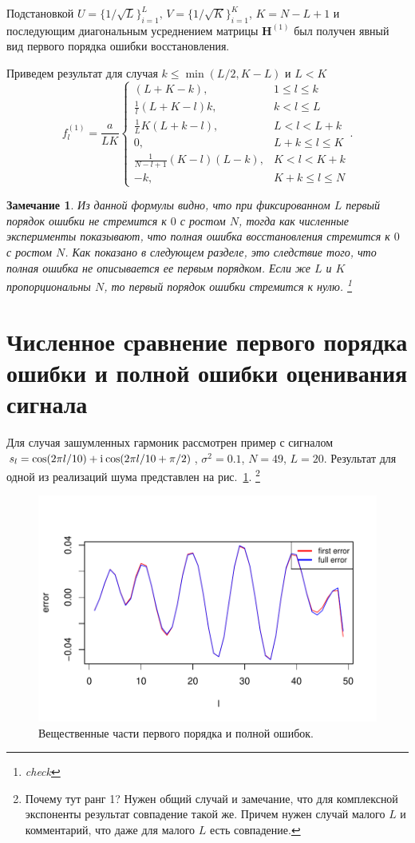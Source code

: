 \documentclass{spisok-article}
\newtheorem{remark}{Замечание}%
\begin{document}
Подстановкой $U = \{1/\sqrt{L}\}^{L}_{i = 1},\, V = \{1/\sqrt{K}\}^{K}_{i = 1}$, $K = N - L + 1$ и последующим диагональным усреднением матрицы $\mathbf{H}^{(1)}$ был получен явный вид первого порядка ошибки восстановления.

Приведем результат для случая $k \leq \min(L/2, K - L)$ и $L < K$
$$f^{(1)}_l = \frac{a}{{LK}}
\begin{cases}
	(L + K - k), & \text{$1 \leq l \leq k$}\\
	\frac{1}{l}(L + K - l)k, & \text{$k < l \leq L$}\\
	\frac{1}{L}K(L + k - l), &\text{$L < l < L + k$}\\
	0, &\text{$L + k \leq l \leq K$}\\
	\frac{1}{N - l + 1}(K - l)(L - k), &\text{$K < l < K + k$}\\
	-k, &\text{$K + k \leq l \leq N $}
\end{cases}.$$

\begin{remark}
Из данной формулы видно, что при фиксированном $L$ первый порядок ошибки не стремится к $0$ с ростом $N$, тогда как численные эксперименты показывают, что полная ошибка восстановления стремится к $0$ с ростом $N$. Как показано в следующем разделе, это следствие того, что полная ошибка не описывается ее первым порядком. Если же $L$ и $K$ пропорциональны $N$, то первый порядок ошибки стремится к нулю. \footnote{check} 
\end{remark}

\section{Численное сравнение первого порядка ошибки и полной ошибки оценивания сигнала}
\label{sec:results}
Для случая зашумленных гармоник рассмотрен пример с сигналом $s_l = \cos(2 \pi l / 10) + \mathrm{i}\mkern1mu\cos(2 \pi l / 10 + \pi/2)$, $\sigma^2 = 0.1$, $N = 49$, $L = 20$. Результат для одной из реализаций шума представлен на рис.~\ref{fig:harm_noise}.
\footnote{Почему тут ранг 1? Нужен общий случай и замечание, что для комплексной экспоненты результат совпадение такой же. Причем нужен случай малого $L$ и комментарий, что даже для малого $L$ есть совпадение.}

\begin{figure}[H]
	\begin{center}
		\includegraphics[width=0.6\linewidth]{img/first_vs_full_re.pdf}
		\caption{Вещественные части первого порядка и полной ошибок.}
		\label{fig:harm_noise}
	\end{center}
\end{figure}
\end{document}
